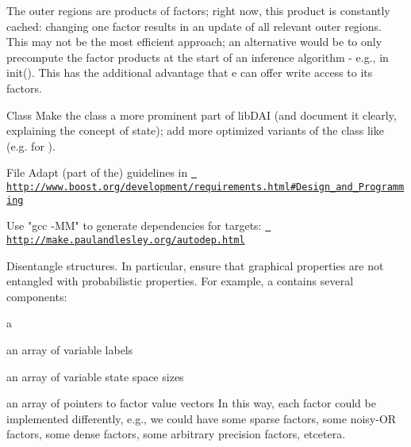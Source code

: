 \begin{DoxyRefList}
The outer regions are products of factors; right now, this product is constantly cached\+: changing one factor results in an update of all relevant outer regions. This may not be the most efficient approach; an alternative would be to only precompute the factor products at the start of an inference algorithm -\/ e.\+g., in init(). This has the additional advantage that  e can offer write access to its factors.  
\item[Class \doxylink{classdai_1_1State}{dai\+::State} ]\label{ideas__ideas000013}%
%
 Make the  class a more prominent part of lib\+DAI (and document it clearly, explaining the concept of state); add more optimized variants of the  class like  (e.\+g. for ).  
\item[File \doxylink{doc_8h}{doc.h} ]\label{ideas__ideas000006}%
%
 Adapt (part of the) guidelines in \href{http://www.boost.org/development/requirements.html\#Design_and_Programming}{\texttt{ http\+://www.\+boost.\+org/development/requirements.\+html\#\+Design\+\_\+and\+\_\+\+Programming}}

\label{ideas__ideas000007}%
%
 Use "{}gcc -\/\+MM"{} to generate dependencies for targets\+: \href{http://make.paulandlesley.org/autodep.html}{\texttt{ http\+://make.\+paulandlesley.\+org/autodep.\+html}}

\label{ideas__ideas000008}%
%
 Disentangle structures. In particular, ensure that graphical properties are not entangled with probabilistic properties. For example, a  contains several components\+:
\begin{DoxyItemize}
\item a 
\item an array of variable labels
\item an array of variable state space sizes
\item an array of pointers to factor value vectors In this way, each factor could be implemented differently, e.\+g., we could have some sparse factors, some noisy-\/\+OR factors, some dense factors, some arbitrary precision factors, etcetera.
\end{DoxyItemize}


\end{DoxyRefList}
